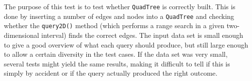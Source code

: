 The purpose of this test is to test whether \texttt{QuadTree} is correctly built. This is done by inserting a number of edges and nodes into a \texttt{QuadTree} and checking whether the \texttt{query2D()} method (which performs a range search in a given two-dimensional interval) finds the correct edges. The input data set is small enough to give a good overview of what each query should produce, but still large enough to allow a certain diversity in the test cases. If the data set was very small, several tests might yield the same results, making it difficult to tell if this is simply by accident or if the query actually produced the right outcome.
